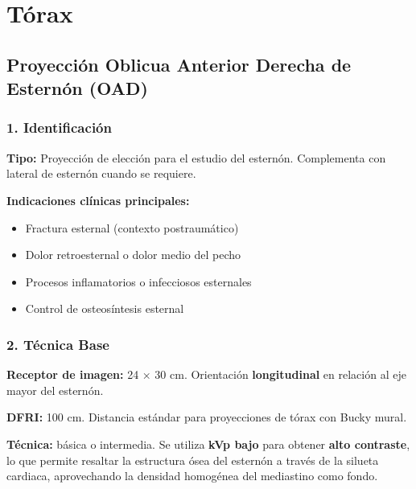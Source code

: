 \clearpage

	
\section{Tórax}

\subsection{Proyección Oblicua Anterior Derecha de Esternón (OAD)}

\subsubsection*{1. Identificación}

\textbf{Tipo:} Proyección de elección para el estudio del esternón. Complementa con lateral de esternón cuando se requiere.

\textbf{Indicaciones clínicas principales:}
\begin{itemize}
	\item Fractura esternal (contexto postraumático)
	\item Dolor retroesternal o dolor medio del pecho
	\item Procesos inflamatorios o infecciosos esternales
	\item Control de osteosíntesis esternal
\end{itemize}

\subsubsection*{2. Técnica Base}

\textbf{Receptor de imagen:} 24 × 30 cm. Orientación \textbf{longitudinal} en relación al eje mayor del esternón.

\textbf{DFRI:} 100 cm. Distancia estándar para proyecciones de tórax con Bucky mural.

\textbf{Técnica:} básica o intermedia. Se utiliza \textbf{kVp bajo} para obtener \textbf{alto contraste}, lo que permite resaltar la estructura ósea del esternón a través de la silueta cardiaca, aprovechando la densidad homogénea del mediastino como fondo.


